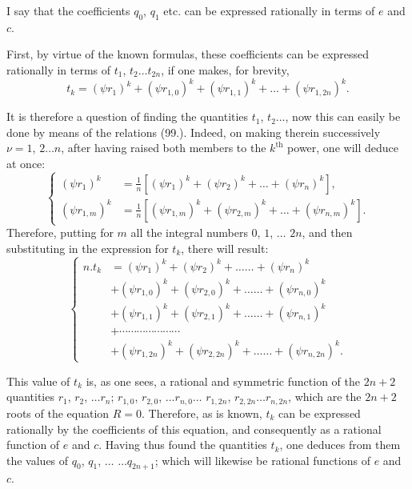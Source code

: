 \documentclass{article}
\begin{document}
I say that the coefficients $q_{0}$, $q_{1}$ etc. can be expressed rationally in terms of $e$ and $c$.

First, by virtue of the known formulas, these coefficients can be expressed rationally in terms of $t_{1}$, $t_{2}\ldots t_{2n}$, if one makes, for brevity,
\[ t_{k}=(\psi r_{1})^{k}+(\psi r_{1,0})^{k}+(\psi r_{1,1})^{k}+\ldots+(\psi r_{1,2n})^{k}. \tag{101.} \]

It is therefore a question of finding the quantities $t_{1}$, $t_{2}\ldots$, now this can easily be done by means of the relations (99.). Indeed, on making therein successively $\nu=1$, $2\ldots n$, after having raised both members to the $k^{\text{th}}$ power, one will deduce at once:
\[ \left\{\begin{aligned}
(\psi r_{1})^{k}&=\frac{1}{n}\left[(\psi r_{1})^{k}+(\psi r_{2})^{k}+\ldots+(\psi r_{n})^{k}\right],\\
(\psi r_{1,m})^{k}&=\frac{1}{n}\left[(\psi r_{1,m})^{k}+(\psi r_{2,m})^{k}+\ldots+(\psi r_{n,m})^{k}\right].
\end{aligned}\right. \tag{102.} \]
Therefore, putting for $m$ all the integral numbers $0$, $1$, $\ldots$ $2n$, and then substituting in the expression for $t_{k}$, there will result:
\[ \left\{\begin{aligned}
n.t_{k}&=(\psi r_{1})^{k}+(\psi r_{2})^{k}+\ldots\ldots+(\psi r_{n})^{k}\\
&+(\psi r_{1,0})^{k}+(\psi r_{2,0})^{k}+\ldots\ldots+(\psi r_{n,0})^{k}\\
&+(\psi r_{1,1})^{k}+(\psi r_{2,1})^{k}+\ldots\ldots+(\psi r_{n,1})^{k}\\
&+\cdots\cdots\cdots\cdots\cdots\cdots\cdots\\
&+(\psi r_{1,2n})^{k}+(\psi r_{2,2n})^{k}+\ldots\ldots+(\psi r_{n,2n})^{k}.
\end{aligned}\right. \tag{103.} \]

This value of $t_{k}$ is, as one sees, a rational and symmetric function of the $2n+2$ quantities $r_{1}$, $r_{2}$, $\ldots r_{n}$; $r_{1,0}$, $r_{2,0}$, $\ldots r_{n,0}\ldots$ $r_{1,2n}$, $r_{2,2n}\ldots r_{n,2n}$, which are the $2n+2$ roots of the equation $R=0$. Therefore, as is known, $t_{k}$ can be expressed rationally by the coefficients of this equation, and consequently as a rational function of $e$ and $c$. Having thus found the quantities $t_{k}$, one deduces from them the values of $q_{0}$, $q_{1}$, $\ldots$ $\ldots q_{2n+1}$; which will likewise be rational functions of $e$ and $c$.
\end{document}
